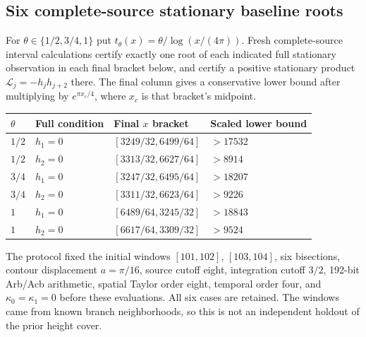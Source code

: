 \documentclass[11pt]{article}
\numberwithin{equation}{section}
\theoremstyle{definition}
\theoremstyle{remark}
\newcommand{\Lag}{\mathcal L}
\begin{document}
\subsection{Six complete-source stationary baseline roots}
\label{upd:stationary-baseline}

For $\theta\in\{1/2,3/4,1\}$ put
$t_\theta(x)=\theta/\log(x/(4\pi))$.  Fresh complete-source interval
calculations certify exactly one root of each indicated full stationary
observation in each final bracket below, and certify a positive
stationary product $\Lag_j=-h_jh_{j+2}$ there.  The final column gives
a conservative lower bound after multiplying by $e^{\pi x_c/4}$,
where $x_c$ is that bracket's midpoint.
\begin{center}\small
\begin{tabular}{@{}llll@{}}
\toprule
$\theta$ & Full condition & Final $x$ bracket & Scaled lower bound\\
\midrule
$1/2$ &$h_1=0$ &$[3249/32,6499/64]$ &$>17532$\\
$1/2$ &$h_2=0$ &$[3313/32,6627/64]$ &$>8914$\\
$3/4$ &$h_1=0$ &$[3247/32,6495/64]$ &$>18207$\\
$3/4$ &$h_2=0$ &$[3311/32,6623/64]$ &$>9226$\\
$1$ &$h_1=0$ &$[6489/64,3245/32]$ &$>18843$\\
$1$ &$h_2=0$ &$[6617/64,3309/32]$ &$>9524$\\
\bottomrule
\end{tabular}
\end{center}
The protocol fixed the initial windows $[101,102]$, $[103,104]$,
six bisections, contour displacement $a=\pi/16$, source cutoff eight,
integration cutoff $3/2$, 192-bit Arb/Acb arithmetic, spatial Taylor
order eight, temporal order four, and $\kappa_0=\kappa_1=0$ before
these evaluations. All six cases are retained. The windows came from
known branch neighborhoods, so this is not an independent holdout of
the prior height cover.
\end{document}
